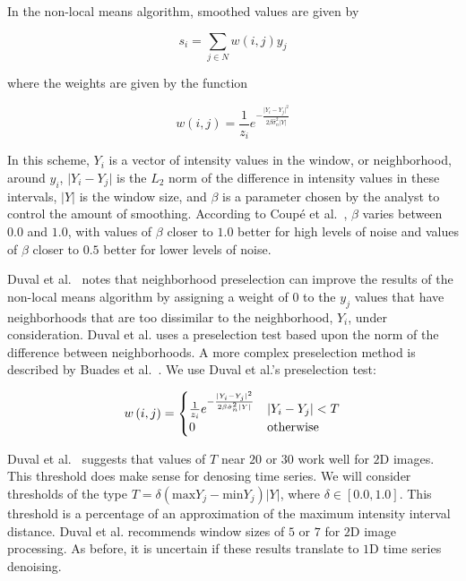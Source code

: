 \documentclass[11pt]{article}
\theoremstyle{definition}
\begin{document}
In the non-local means algorithm, smoothed values are given by

\begin{displaymath}
s_i = \sum _{j \in N} w \left(i, j \right) y_j
\end{displaymath}

\noindent
where the weights are given by the function

\begin{displaymath}
w \left(i, j \right) = \frac{1}{z_i} e^{-\frac{\lvert Y_i - Y_j \rvert ^2}{2 \beta \hat{\sigma}^2_n \lvert Y \rvert}}
\end{displaymath}

In this scheme, $Y_i$ is a vector of intensity values in the window,
or neighborhood, around $y_i$, $\lvert Y_i - Y_j \rvert$ is the $L_2$
norm of the difference in intensity values in these intervals, $\lvert
Y \rvert$ is the window size, and $\beta$ is a parameter chosen by the
analyst to control the amount of smoothing. According to Coup{\'e} et
al.~\cite{Coupe07}, $\beta$ varies between $0.0$ and $1.0$, with
values of $\beta$ closer to $1.0$ better for high levels of noise and
values of $\beta$ closer to $0.5$ better for lower levels of noise.

Duval et al.~\cite{Duval11} notes that neighborhood preselection can
improve the results of the non-local means algorithm by assigning a
weight of $0$ to the $y_j$ values that have neighborhoods that are too
dissimilar to the neighborhood, $Y_i$, under consideration. Duval et
al. uses a preselection test based upon the norm of the difference
between neighborhoods. A more complex preselection method is described
by Buades et al.~\cite{Buades05}. We use Duval et al.'s preselection
test:

\begin{displaymath}
w\left(i, j\right) = 
\begin{cases}
\frac{1}{z_i} e^{-\frac{\lvert Y_i - Y_j \rvert ^2}{2 \beta \hat{\sigma}^2_n \lvert Y \rvert}} & \lvert Y_i - Y_j \rvert < T \\
0 & $otherwise$
\end{cases}
\end{displaymath}

Duval et al.~\cite{Duval11} suggests that values of $T$ near $20$ or
$30$ work well for $2$D images. This threshold does make sense for
denosing time series. We will consider thresholds of the type $T =
\delta \left( \mathrm{max} Y_j - \mathrm{min} Y_j \right) \lvert Y
\rvert$, where $\delta \in \left[ 0.0, 1.0 \right]$. This threshold is
a percentage of an approximation of the maximum intensity interval
distance. Duval et al. recommends window sizes of $5$ or $7$ for $2$D
image processing. As before, it is uncertain if these results
translate to $1$D time series denoising.
\end{document}
